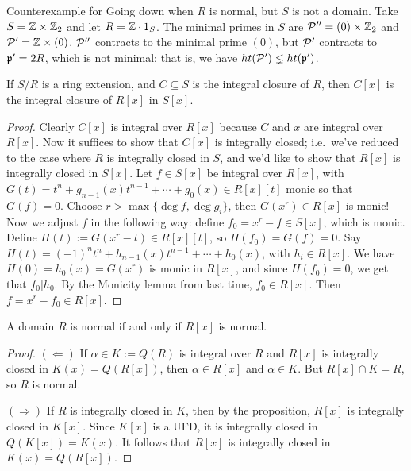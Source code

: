  \setcounter{lecture}{26}

 \begin{example}
   Counterexample for Going down when $R$ is normal, but $S$ is not a domain. Take
   $S=\ZZ\times \ZZ_2$ and let $R=\ZZ\cdot 1_S$. The minimal primes in $S$ are
   $\P''=(0)\times \ZZ_2$ and $\P'=\ZZ\times (0)$. $\P''$ contracts to
   the minimal prime $(0)$, but $\P'$ contracts to $\p'=2R$, which is not minimal; that
   is, we have $ht(\P')\lneq ht(\p')$.
 \end{example}

 \begin{proposition}
   If $S/R$ is a ring extension, and $C\subseteq S$ is the integral closure of $R$, then
   $C[x]$ is the integral closure of $R[x]$ in $S[x]$.
 \end{proposition}
 \begin{proof}
   Clearly $C[x]$ is integral over $R[x]$ because $C$ and $x$ are integral over $R[x]$.
   Now it suffices to show that $C[x]$ is integrally closed; i.e.~we've reduced to the
   case where $R$ is integrally closed in $S$, and we'd like to show that $R[x]$ is
   integrally closed in $S[x]$. Let $f\in S[x]$ be integral over $R[x]$, with
   $G(t)=t^n+g_{n-1}(x)t^{n-1}+\cdots+g_0(x)\in R[x][t]$ monic so that $G(f)=0$. Choose
   $r> \max\{\deg f, \deg g_i\}$, then $G(x^r)\in R[x]$ is monic! Now we adjust $f$ in
   the following way: define $f_0=x^r-f\in S[x]$, which is monic. Define
   $H(t):=G(x^r-t)\in R[x][t]$, so $H(f_0)=G(f)=0$. Say $H(t)=(-1)^nt^n +
   h_{n-1}(x)t^{n-1}+\cdots+h_0(x)$, with $h_i\in R[x]$. We have $H(0)=h_0(x)=G(x^r)$ is
   monic in $R[x]$, and since $H(f_0)=0$, we get that $f_0|h_0$. By the Monicity lemma
   from last time, $f_0\in R[x]$. Then $f=x^r-f_0\in R[x]$.
 \end{proof}
 \begin{theorem}
   A domain $R$ is normal if and only if $R[x]$ is normal.
 \end{theorem}
 \begin{proof}
   $(\Leftarrow)$ If $\alpha\in K:=Q(R)$ is integral over $R$ and $R[x]$ is integrally
   closed in $K(x)=Q(R[x])$, then $\alpha\in R[x]$ and $\alpha\in K$. But $R[x]\cap K=R$,
   so $R$ is normal.

   $(\Rightarrow)$ If $R$ is integrally closed in $K$, then by the proposition, $R[x]$ is
   integrally closed in $K[x]$. Since $K[x]$ is a UFD, it is integrally closed in
   $Q(K[x])=K(x)$. It follows that $R[x]$ is integrally closed in $K(x)=Q(R[x])$.
 \end{proof}
